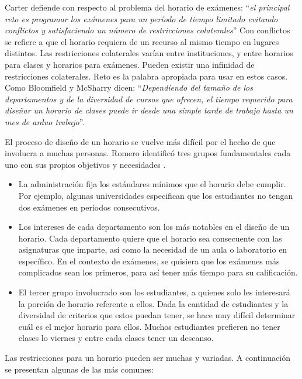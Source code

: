 Carter defiende con respecto al problema del horario de exámenes: ``\emph{el principal reto es programar los
exámenes para un período de tiempo limitado evitando conflictos y satisfaciendo un número de restricciones
colaterales}'' \cite{Carter's summary} Con conflictos se refiere a que el horario requiera de un recurso
al mismo tiempo en lugares distintos. Las restricciones colaterales var\'ian entre instituciones, y entre
horarios para clases y horarios para exámenes. Pueden existir una infinidad de restricciones colaterales.
Reto es la palabra apropiada para usar en estos casos.
Como Bloomfield y McSharry dicen: ``\emph{Dependiendo del tamaño de los departamentos y de la diversidad
de cursos que ofrecen, el tiempo requerido para diseñar un horario de clases puede ir desde una simple
tarde de trabajo hasta un mes de arduo trabajo}''. \cite{Bloomfield and McSharry says}

El proceso de diseño de un horario se vuelve más difícil por el hecho de que involucra a muchas personas.
Romero identificó tres grupos fundamentales cada uno con sus propios objetivos y necesidades \cite{Romero}.

\begin{itemize}
	\item La administración fija los estándares  mínimos que el horario debe cumplir. Por ejemplo, algunas
		universidades especifican que los estudiantes no tengan dos exámenes en períodos consecutivos.
	\item Los intereses de cada departamento son los más notables en el diseño de un horario. Cada departamento
		quiere que el horario sea consecuente con las asignaturas que imparte, as\'i como la necesidad de un
		aula o laboratorio en específico. En el contexto de exámenes, se quisiera que los exámenes más complicados
		sean los primeros, para as\'i tener más tiempo para su calificación.
	\item El tercer grupo involucrado son los estudiantes, a quienes solo les interesará la porción de horario
		referente a ellos. Dada la cantidad de estudiantes y la diversidad de criterios que estos puedan tener,
		se hace muy difícil determinar cu\'al es el mejor horario para ellos. Muchos estudiantes prefieren no
		tener clases lo viernes y entre cada clases tener un descanso.		
\end{itemize}

Las restricciones para un horario pueden ser muchas y variadas. A continuación se presentan algunas de 
las más comunes:

